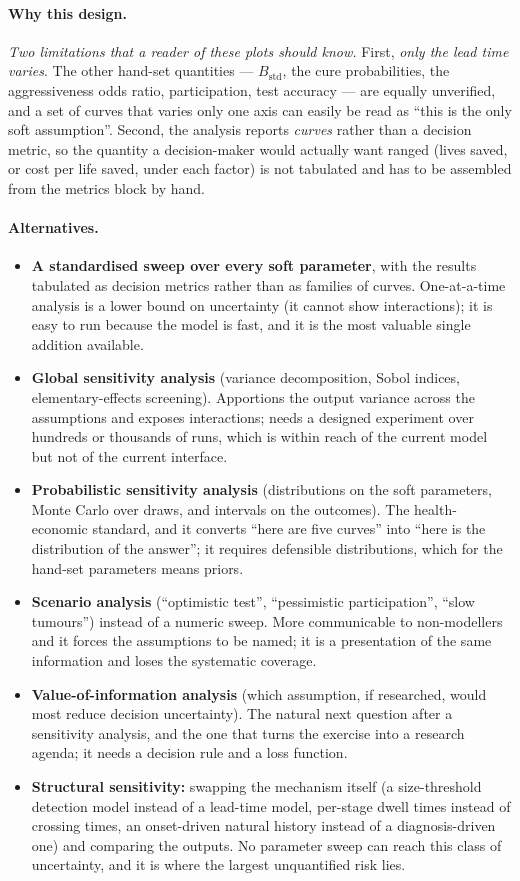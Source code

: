 \documentclass[12pt,a4paper]{article}
\newcommand{\why}[1]{\paragraph{Why this design.} #1}
\newcommand{\alt}[1]{\paragraph{Alternatives.} #1}
\begin{document}
\why{\emph{Two limitations that a reader of these plots should know.} First, \emph{only the lead time
varies}. The other hand-set quantities --- $B_{\text{std}}$, the cure probabilities, the aggressiveness odds
ratio, participation, test accuracy --- are equally unverified, and a set of curves that varies only one axis
can easily be read as ``this is the only soft assumption''. Second, the analysis reports \emph{curves} rather
than a decision metric, so the quantity a decision-maker would actually want ranged (lives saved, or cost
per life saved, under each factor) is not tabulated and has to be assembled from the metrics block by hand.}

\alt{\begin{itemize}[nosep]
  \item \textbf{A standardised sweep over every soft parameter}, with the results tabulated as decision
        metrics rather than as families of curves. One-at-a-time analysis is a lower bound on uncertainty
        (it cannot show interactions); it is easy to run because the model is fast, and it is the most
        valuable single addition available.
  \item \textbf{Global sensitivity analysis} (variance decomposition, Sobol indices, elementary-effects
        screening). Apportions the output variance across the assumptions and exposes interactions; needs a
        designed experiment over hundreds or thousands of runs, which is within reach of the current model
        but not of the current interface.
  \item \textbf{Probabilistic sensitivity analysis} (distributions on the soft parameters, Monte Carlo over
        draws, and intervals on the outcomes). The health-economic standard, and it converts
        ``here are five curves'' into ``here is the distribution of the answer''; it requires defensible
        distributions, which for the hand-set parameters means priors.
  \item \textbf{Scenario analysis} (``optimistic test'', ``pessimistic participation'', ``slow tumours'')
        instead of a numeric sweep. More communicable to non-modellers and it forces the assumptions to be
        named; it is a presentation of the same information and loses the systematic coverage.
  \item \textbf{Value-of-information analysis} (which assumption, if researched, would most reduce decision
        uncertainty). The natural next question after a sensitivity analysis, and the one that turns the
        exercise into a research agenda; it needs a decision rule and a loss function.
  \item \textbf{Structural sensitivity:} swapping the mechanism itself (a size-threshold detection model
        instead of a lead-time model, per-stage dwell times instead of crossing times, an onset-driven
        natural history instead of a diagnosis-driven one) and comparing the outputs. No parameter sweep can
        reach this class of uncertainty, and it is where the largest unquantified risk lies.
\end{itemize}}
\end{document}
